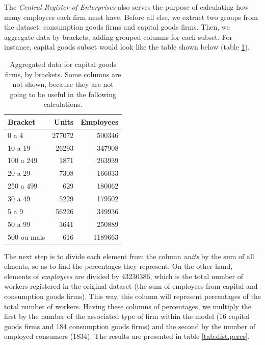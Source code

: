 \documentclass[11pt,]{article}
\begin{document}
The \emph{Central Register of Enterprises} also serves the purpose of
calculating how many employees each firm must have. Before all else, we
extract two groups from the dataset: consumption goods firms and capital
goods firms. Then, we aggregate data by brackets, adding grouped columns
for each subset. For instance, capital goods subset would look like the
table shown below (table \ref{tab:caps}).

\begin{table}

\caption[Aggregated data for capital goods firms, by brackets.]{\label{tab:unnamed-chunk-13}\label{tab:caps}Aggregated data for capital goods firms, by brackets. Some columns are not shown, because they are not going to be useful in the following calculations.}
\centering
\begin{tabular}[t]{lrr}
\toprule
Bracket & Units & Employees\\
\midrule
0 a 4 & 277072 & 500346\\
10 a 19 & 26293 & 347908\\
100 a 249 & 1871 & 263939\\
20 a 29 & 7308 & 166033\\
250 a 499 & 629 & 180062\\
30 a 49 & 5229 & 179502\\
5 a 9 & 56226 & 349936\\
50 a 99 & 3641 & 250889\\
500 ou mais & 616 & 1189663\\
\bottomrule
\end{tabular}
\end{table}

The next step is to divide each element from the column \emph{units} by
the sum of all elments, so as to find the percentages they represent. On
the other hand, elements of \emph{employees} are divided by 43230386,
which is the total number of workers registered in the original dataset
(the sum of employees from capital and consumption goods firms). This
way, this column will represent percentages of the total number of
workers. Having these columns of percentages, we multiply the first by
the number of the associated type of firm within the model (16 capital
goods firms and 184 consumption goods firms) and the second by the
number of employed consumers (1834). The results are presented in table
\ref{tab:dist.percs}.
\end{document}
